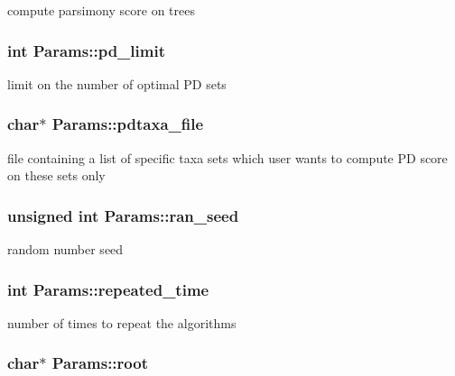compute parsimony score on trees \hypertarget{structParams_a8efb97f088befdd78725c209ed9dbe03}{
\subsubsection[{pd\_\-limit}]{\setlength{\rightskip}{0pt plus 5cm}int {\bf Params::pd\_\-limit}}}
\label{structParams_a8efb97f088befdd78725c209ed9dbe03}
limit on the number of optimal PD sets \hypertarget{structParams_ab6f02cc1e64ce54975e3ce1086ee0519}{
\subsubsection[{pdtaxa\_\-file}]{\setlength{\rightskip}{0pt plus 5cm}char$\ast$ {\bf Params::pdtaxa\_\-file}}}
\label{structParams_ab6f02cc1e64ce54975e3ce1086ee0519}
file containing a list of specific taxa sets which user wants to compute PD score on these sets only \hypertarget{structParams_ae2b98e7ce38bfbbc6ceb4ab2bcb89d1a}{
\subsubsection[{ran\_\-seed}]{\setlength{\rightskip}{0pt plus 5cm}unsigned int {\bf Params::ran\_\-seed}}}
\label{structParams_ae2b98e7ce38bfbbc6ceb4ab2bcb89d1a}
random number seed \hypertarget{structParams_a7b77c9978a0a9763650a583363edb858}{
\subsubsection[{repeated\_\-time}]{\setlength{\rightskip}{0pt plus 5cm}int {\bf Params::repeated\_\-time}}}
\label{structParams_a7b77c9978a0a9763650a583363edb858}
number of times to repeat the algorithms \hypertarget{structParams_ac7f6d239858b254af5c9dafdd2595803}{
\subsubsection[{root}]{\setlength{\rightskip}{0pt plus 5cm}char$\ast$ {\bf Params::root}}}
\label{structParams_ac7f6d239858b254af5c9dafdd2595803}
